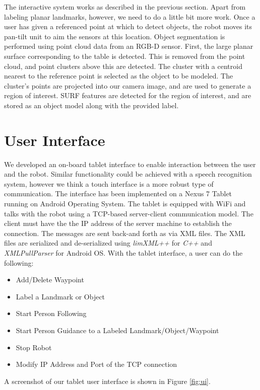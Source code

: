 The interactive system works as described in the previous section. Apart from labeling planar landmarks, however, we need to do a little bit more work. Once a user has given a referenced point at which to detect
objects, the robot moves its pan-tilt unit to aim the sensors
at this location. Object segmentation is performed using
point cloud data from an RGB-D sensor. First, the large
planar surface corresponding to the table is detected. This
is removed from the point cloud, and point clusters above
this are detected. The cluster with a centroid nearest to the
reference point is selected as the object to be modeled. The
cluster’s points are projected into our camera image, and
are used to generate a region of interest. SURF features are
detected for the region of interest, and are stored as an object
model along with the provided label.

\section{User Interface}
\label{sec:map_ui}

We developed an on-board tablet interface to enable interaction between the user and the robot. Similar functionality could be achieved with a speech recognition system, however we think a touch interface is a more robust type of communication. The interface has been implemented on a Nexus 7 Tablet running on Android Operating System. The tablet is equipped with WiFi and talks with the robot using a TCP-based server-client communication model. The client must have the the IP address of the server machine to establish the connection. The messages are sent back-and forth as via XML files. The XML files are serialized and de-serialized using \textit{limXML++} for \textit{C++} and \textit{XMLPullParser} for Android OS. With the tablet interface, a user can do the following:

\begin{itemize}
\item Add/Delete Waypoint
\item Label a Landmark or Object
\item Start Person Following
\item Start Person Guidance to a Labeled Landmark/Object/Waypoint
\item Stop Robot
\item Modify IP Address and Port of the TCP connection
\end{itemize}

A screenshot of our tablet user interface is shown in Figure \ref{fig:ui}.

